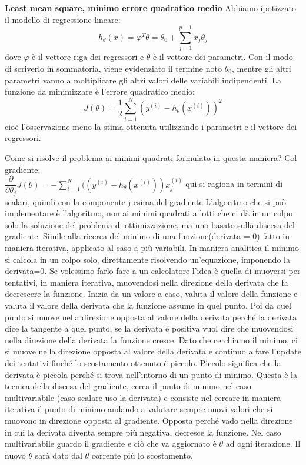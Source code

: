\documentclass[10pt,a4paper]{article}
\begin{document}
\textbf{Least mean square, minimo errore quadratico medio}
Abbiamo ipotizzato il modello di regressione lineare:
\begin{equation}
h_\theta(x)=\varphi^T\theta=\theta_0+\sum_{j=1}^{p-1}x_j\theta_j
\end{equation}
dove $ \varphi $ è il vettore riga dei regressori e $ \theta $ è il vettore dei parametri.
Con il modo di scriverlo in sommatoria, viene evidenziato il termine noto $ \theta_0 $, mentre gli altri parametri vanno a moltiplicare gli altri valori delle variabili indipendenti.
La funzione da minimizzare è l'errore quadratico medio:
\begin{equation}
J(\theta)=\frac{1}{2} \sum_{i=1}^N(y^{(i)}-h_{\theta}(x^{(i)}))^2
\end{equation}
cioè l'osservazione meno la stima ottenuta utilizzando i parametri e il vettore dei regressori.

Come si risolve il problema ai minimi quadrati formulato in questa maniera?
Col gradiente:\\
$ \dfrac{\partial}{\partial \theta_j}J(\theta)=-\sum_{i=1}^N((y^{(i)}-h_\theta (x^{(i)}))x_j^{(i)} $
qui si ragiona in termini di scalari, quindi con la componente j-esima del gradiente
L'algoritmo che si può implementare è l'algoritmo, non ai minimi quadrati a lotti che ci dà in un colpo solo la soluzione del problema di ottimizzazione, ma uno basato sulla discesa del gradiente. Simile alla ricerca del minimo di una funzione(derivata = 0) fatto in maniera iterativa, applicato al caso a più variabili.
In maniera analitica il minimo si calcola in un colpo solo, direttamente risolvendo un'equazione, imponendo la derivata=0.
Se volessimo farlo fare a un calcolatore l'idea è quella di muoversi per tentativi, in maniera iterativa, muovendosi nella direzione della derivata che fa decrescere la funzione. Inizia da un valore a caso, valuta il valore della funzione e valuta il valore della derivata che la funzione assume in quel punto. Poi da quel punto si muove nella direzione opposta al valore della derivata perché la derivata dice la tangente a quel punto, se la derivata è positiva vuol dire che muovendosi nella direzione della derivata la funzione cresce. Dato che cerchiamo il minimo, ci si muove nella direzione opposta al valore della derivata e continuo a fare l'update dei tentativi finché lo scostamento ottenuto è piccolo. Piccolo significa che la derivata è piccola perché si trova nell'intorno di un punto di minimo. Questa è la tecnica della discesa del gradiente, cerca il punto di minimo nel caso multivariabile (caso scalare uso la derivata) e consiste nel cercare in maniera iterativa il punto di minimo andando a valutare sempre nuovi valori che si muovono in direzione opposta al gradiente. Opposta perché vado nella direzione in cui la derivata diventa sempre più negativa, decresce la funzione.
Nel caso multivariabile guardo il gradiente e ciò che va aggiornato è $ \theta $ ad ogni iterazione. Il nuovo $ \theta $ sarà dato dal $ \theta $ corrente più lo scostamento.
\end{document}
